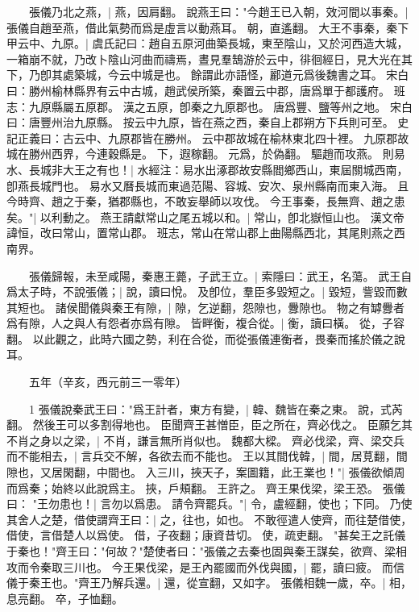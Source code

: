 　　張儀乃北之燕，|{
	燕，因肩翻。
}
說燕王曰："今趙王已入朝，效河間以事秦。|{
	張儀自趙至燕，借此氣勢而爲是虛言以動燕耳。
	朝，直遙翻。
}
大王不事秦，秦下甲云中、九原。|{
	虞氏記曰：趙自五原河曲築長城，東至陰山，又於河西造大城，一箱崩不就，乃改卜陰山河曲而禱焉，晝見羣鵠游於云中，徘徊經日，見大光在其下，乃卽其處築城，今云中城是也。
	餘謂此亦語怪，酈道元爲後魏書之耳。
	宋白曰：勝州榆林縣界有云中古城，趙武侯所築，秦置云中郡，唐爲單于都護府。
	班志：九原縣屬五原郡。
	漢之五原，卽秦之九原郡也。
	唐爲豐、鹽等州之地。
	宋白曰：唐豐州治九原縣。
	按云中九原，皆在燕之西，秦自上郡朔方下兵則可至。
	史記正義曰：古云中、九原郡皆在勝州。
	云中郡故城在榆林東北四十裡。
	九原郡故城在勝州西界，今連穀縣是。
	下，遐稼翻。
	元爲，於偽翻。
}
驅趙而攻燕。
	則易水、長城非大王之有也！|{
	水經注：易水出涿郡故安縣閻鄉西山，東屆關城西南，卽燕長城門也。
	易水又曆長城而東過范陽、容城、安次、泉州縣南而東入海。
}
且今時齊、趙之于秦，猶郡縣也，不敢妄舉師以攻伐。
	今王事秦，長無齊、趙之患矣。"|{
	以利動之。
}
燕王請獻常山之尾五城以和。|{
	常山，卽北嶽恒山也。
	漢文帝諱恒，改曰常山，置常山郡。
	班志，常山在常山郡上曲陽縣西北，其尾則燕之西南界。
}

　　張儀歸報，未至咸陽，秦惠王薨，子武王立。|{
	索隱曰：武王，名蕩。
}
武王自爲太子時，不說張儀；|{
	說，讀曰悅。
}
及卽位，羣臣多毀短之。|{
	毀短，訾毀而數其短也。
}
諸侯聞儀與秦王有隙，|{
	隙，乞逆翻，怨隙也，釁隙也。
	物之有罅釁者爲有隙，人之與人有怨者亦爲有隙。
}
皆畔衡，複合從。|{
	衡，讀曰橫。
	從，子容翻。
	以此觀之，此時六國之勢，利在合從，而從張儀連衡者，畏秦而搖於儀之說耳。
}

　　五年（辛亥，西元前三一零年）

　　1 張儀說秦武王曰："爲王計者，東方有變，|{
	韓、魏皆在秦之東。
	說，式芮翻。
}
然後王可以多割得地也。
	臣聞齊王甚憎臣，臣之所在，齊必伐之。
	臣願乞其不肖之身以之梁，|{
	不肖，謙言無所肖似也。
	魏都大樑。
}
齊必伐梁，齊、梁交兵而不能相去，|{
	言兵交不解，各欲去而不能也。
}
王以其間伐韓，|{
	間，居莧翻，間隙也，又居閑翻，中間也。
}
入三川，挾天子，案圖籍，此王業也！"|{
	張儀欲傾周而爲秦；始終以此說爲主。
	挾，戶頰翻。
}
王許之。
	齊王果伐梁，梁王恐。
	張儀曰： "王勿患也！|{
	言勿以爲患。
}
請令齊罷兵。"|{
	令，盧經翻，使也；下同。
}
乃使其舍人之楚，借使謂齊王曰：|{
	之，往也，如也。
	不敢徑遣人使齊，而往楚借使，借使，言借楚人以爲使。
	借，子夜翻；康資昔切。
	使，疏吏翻。
}
"甚矣王之託儀于秦也！"齊王曰："何故？"楚使者曰："張儀之去秦也固與秦王謀矣，欲齊、梁相攻而令秦取三川也。
	今王果伐梁，是王內罷國而外伐與國，|{
	罷，讀曰疲。
}
而信儀于秦王也。"齊王乃解兵還。|{
	還，從宣翻，又如字。
}
張儀相魏一歲，卒。|{
	相，息亮翻。
	卒，子恤翻。
}

